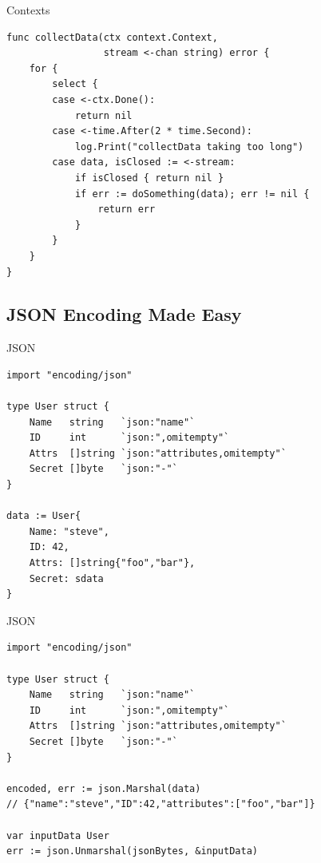 \documentclass[pdf]{beamer}
\begin{document}
\begin{frame}[fragile]{Contexts}
\begin{lstlisting}
func collectData(ctx context.Context, 
                 stream <-chan string) error {
    for {
        select {
        case <-ctx.Done():
            return nil
        case <-time.After(2 * time.Second):
            log.Print("collectData taking too long")
        case data, isClosed := <-stream:   
            if isClosed { return nil }
            if err := doSomething(data); err != nil {
                return err
            }
        }
    }
}
\end{lstlisting}
\end{frame}

\subsection{JSON Encoding Made Easy}
\begin{frame}[fragile]{JSON}
\begin{lstlisting}
import "encoding/json"

type User struct {
    Name   string   `json:"name"`
    ID     int      `json:",omitempty"`
    Attrs  []string `json:"attributes,omitempty"`
    Secret []byte   `json:"-"`
}

data := User{
    Name: "steve", 
    ID: 42, 
    Attrs: []string{"foo","bar"}, 
    Secret: sdata
}
\end{lstlisting}
\end{frame}

\begin{frame}[fragile]{JSON}
\begin{lstlisting}
import "encoding/json"

type User struct {
    Name   string   `json:"name"`
    ID     int      `json:",omitempty"`
    Attrs  []string `json:"attributes,omitempty"`
    Secret []byte   `json:"-"`
}

encoded, err := json.Marshal(data)
// {"name":"steve","ID":42,"attributes":["foo","bar"]}

var inputData User
err := json.Unmarshal(jsonBytes, &inputData)
\end{lstlisting}
\end{frame}
\section{}
\end{document}
